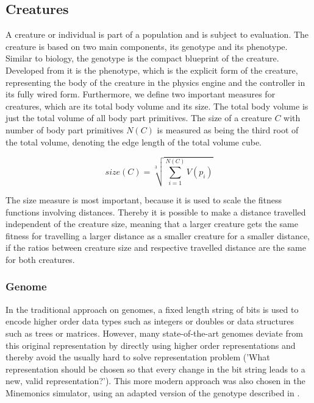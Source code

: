 \documentclass[main]{subfiles}
\begin{document}
\subsection{Creatures}
\label{subsec:creatures}

A creature or individual is part of a population and is subject to evaluation. %
%
The creature is based on two main components, its genotype and its phenotype. %
%
Similar to biology, the genotype is the compact blueprint of the creature. %
%
Developed from it is the phenotype, which is the explicit form of the creature, representing the body of the creature in the physics engine and the controller in its fully wired form. %
%
Furthermore, we define two important measures for creatures, which are its total body volume and its size. %
%
The total body volume is just the total volume of all body part primitives. %
%
The size of a creature \(C\) with number of body part primitives \(N(C)\) is measured as being the third root of the total volume, denoting the edge length of the total volume cube. 

\begin{equation}
size(C) = \sqrt[3]{\sum\limits^{N(C)}_{i=1} V(p_i)}
\label{eqn:body-cube-root-length}
\end{equation}

The size measure is most important, because it is used to scale the fitness functions involving distances. %
%
Thereby it is possible to make a distance travelled independent of the creature size, meaning that a larger creature gets the same fitness for travelling a larger distance as a smaller creature for a smaller distance, if the ratios between creature size and respective travelled distance are the same for both creatures.

\subsubsection{Genome}

In the traditional approach on genomes, a fixed length string of bits is used to encode higher order data types such as integers or doubles or data structures such as trees or matrices. %
%
However, many state-of-the-art genomes deviate from this original representation by directly using higher order representations and thereby avoid the usually hard to solve representation problem ('What representation should be chosen so that every change in the bit string leads to a new, valid representation?'). %
%
This more modern approach was also chosen in the Minemonics simulator, using an adapted version of the genotype described in \cite{bib:Graham2009}.
\end{document}

